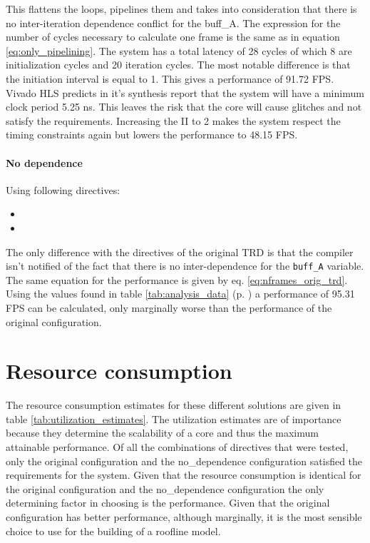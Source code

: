 This flattens the loops, pipelines them and takes into consideration that there is no inter-iteration dependence conflict for the buff\_A. The expression for the number of cycles necessary to calculate one frame is the same as in equation \ref{eq:only_pipelining}. The system has a total latency of 28 cycles of which 8 are initialization cycles and 20 iteration cycles. The most notable difference is that the initiation interval is equal to 1. This gives a performance of 91.72 FPS. Vivado HLS predicts in it's synthesis report that the system will have a minimum clock period 5.25 ns. This leaves the risk that the core will cause glitches and not satisfy the requirements. Increasing the II to 2 makes the system respect the timing constraints again but lowers the performance to 48.15 FPS. 

\paragraph{No dependence}
Using following directives:

\begin{itemize}
\item {}
\item {}
\end{itemize}

The only difference with the directives of the original TRD is that the compiler isn't notified of the fact that there is no inter-dependence for the \texttt{buff\_A} variable. The same equation for the performance is given by eq. \ref{eq:nframes_orig_trd}. Using the values found in table 
\ref{tab:analysis_data} (p. \pageref{tab:analysis_data}) a performance of 95.31 FPS can be calculated, only marginally worse than the performance of the original configuration. 


\section{Resource consumption}

The resource consumption estimates for these different solutions are given in table \ref{tab:utilization_estimates}. The utilization estimates are of importance because they determine the scalability of a core and thus the maximum attainable performance. Of all the combinations of directives that were tested, only the original configuration and the no\_dependence configuration satisfied the requirements for the system. Given that the resource consumption is identical for the original configuration and the no\_dependence configuration the only determining factor in choosing is the performance. Given that the original configuration has better performance, although marginally, it is the most sensible choice to use for the building of a roofline model.\\

